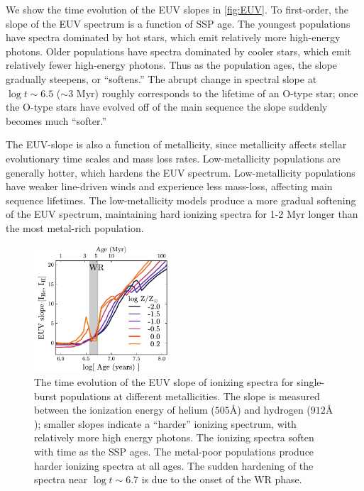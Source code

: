 \documentclass[linenumbers, trackchanges, tighten]{aastex61}%
\newcommand{\Fig}[1]{\autoref{fig:#1}}
\newcommand{\ang}{\ensuremath{\mbox{\AA}}}
\begin{document}
We show the time evolution of the EUV slopes in \Fig{EUV}. To first-order, the slope of the EUV spectrum is a function of SSP age. The youngest populations have spectra dominated by hot stars, which emit relatively more high-energy photons. Older populations have spectra dominated by cooler stars, which emit relatively fewer high-energy photons. Thus as the population ages, the slope gradually steepens, or ``softens.'' The abrupt change in spectral slope at $\log t \sim 6.5$ ($\sim 3$ Myr) roughly corresponds to the lifetime of an O-type star; once the O-type stars have evolved off of the main sequence the slope suddenly becomes much ``softer.''

The EUV-slope is also a function of metallicity, since metallicity affects stellar evolutionary time scales and mass loss rates. Low-metallicity populations are generally hotter, which hardens the EUV spectrum. Low-metallicity populations have weaker line-driven winds and experience less mass-loss, affecting main sequence lifetimes. The low-metallicity models produce a more gradual softening of the EUV spectrum, maintaining hard ionizing spectra for 1-2 Myr longer than the most metal-rich population. 

\begin{figure}[!htbp]
  \begin{centering}
    \includegraphics[width=0.45\textwidth]{f3.pdf}
    \caption{The time evolution of the EUV slope of ionizing spectra for single-burst populations at different metallicities. The slope is measured between the ionization energy of helium ($505\ang$) and hydrogen ($912\ang$); smaller slopes indicate a ``harder'' ionizing spectrum, with relatively more high energy photons. The ionizing spectra soften with time as the SSP ages. The metal-poor populations produce harder ionizing spectra at all ages. The sudden hardening of the spectra near $\log t \sim 6.7$ is due to the onset of the WR phase.}
    \label{fig:EUV}
  \end{centering}
\end{figure}
\end{document}
